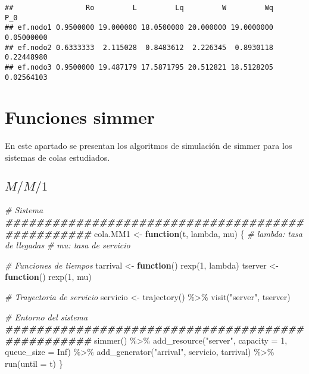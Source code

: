 \documentclass[
]{book}
\newenvironment{Shaded}{\begin{snugshade}}{\end{snugshade}}
\newcommand{\AttributeTok}[1]{\textcolor[rgb]{0.77,0.63,0.00}{#1}}
\newcommand{\CommentTok}[1]{\textcolor[rgb]{0.56,0.35,0.01}{\textit{#1}}}
\newcommand{\ConstantTok}[1]{\textcolor[rgb]{0.00,0.00,0.00}{#1}}
\newcommand{\ControlFlowTok}[1]{\textcolor[rgb]{0.13,0.29,0.53}{\textbf{#1}}}
\newcommand{\DecValTok}[1]{\textcolor[rgb]{0.00,0.00,0.81}{#1}}
\newcommand{\DocumentationTok}[1]{\textcolor[rgb]{0.56,0.35,0.01}{\textbf{\textit{#1}}}}
\newcommand{\FunctionTok}[1]{\textcolor[rgb]{0.00,0.00,0.00}{#1}}
\newcommand{\NormalTok}[1]{#1}
\newcommand{\OtherTok}[1]{\textcolor[rgb]{0.56,0.35,0.01}{#1}}
\newcommand{\SpecialCharTok}[1]{\textcolor[rgb]{0.00,0.00,0.00}{#1}}
\newcommand{\StringTok}[1]{\textcolor[rgb]{0.31,0.60,0.02}{#1}}
\theoremstyle{definition}
\theoremstyle{definition}
\theoremstyle{definition}
\theoremstyle{definition}
\theoremstyle{remark}
\begin{document}
\begin{verbatim}
##                 Ro         L         Lq         W         Wq        P_0
## ef.nodo1 0.9500000 19.000000 18.0500000 20.000000 19.0000000 0.05000000
## ef.nodo2 0.6333333  2.115028  0.8483612  2.226345  0.8930118 0.22448980
## ef.nodo3 0.9500000 19.487179 17.5871795 20.512821 18.5128205 0.02564103
\end{verbatim}

\hypertarget{COLASF}{%
\section{Funciones simmer}\label{COLASF}}

En este apartado se presentan los algoritmos de simulación de simmer para los sistemas de colas estudiados.

\hypertarget{mm1-1}{%
\subsection{\texorpdfstring{\(M/M/1\)}{M/M/1}}\label{mm1-1}}

\begin{Shaded}
\begin{Highlighting}[]
\CommentTok{\# Sistema}
\DocumentationTok{\#\#\#\#\#\#\#\#\#\#\#\#\#\#\#\#\#\#\#\#\#\#\#\#\#\#\#\#\#\#\#\#\#\#\#\#\#\#\#\#\#\#\#\#\#\#\#\#\#}
\NormalTok{cola.MM1 }\OtherTok{\textless{}{-}} \ControlFlowTok{function}\NormalTok{(t, lambda, mu)}
\NormalTok{\{}
  \CommentTok{\# lambda: tasa de llegadas}
  \CommentTok{\# mu: tasa de servicio}

  \CommentTok{\# Funciones de tiempos}
\NormalTok{  tarrival }\OtherTok{\textless{}{-}} \ControlFlowTok{function}\NormalTok{() }\FunctionTok{rexp}\NormalTok{(}\DecValTok{1}\NormalTok{, lambda)}
\NormalTok{  tserver }\OtherTok{\textless{}{-}} \ControlFlowTok{function}\NormalTok{() }\FunctionTok{rexp}\NormalTok{(}\DecValTok{1}\NormalTok{, mu)}
  
  \CommentTok{\# Trayectoria de servicio}
\NormalTok{  servicio }\OtherTok{\textless{}{-}} \FunctionTok{trajectory}\NormalTok{() }\SpecialCharTok{\%\textgreater{}\%}
    \FunctionTok{visit}\NormalTok{(}\StringTok{"server"}\NormalTok{, tserver)               }

  \CommentTok{\# Entorno del sistema }
  \DocumentationTok{\#\#\#\#\#\#\#\#\#\#\#\#\#\#\#\#\#\#\#\#\#\#\#\#\#\#\#\#\#\#\#\#\#\#\#\#\#\#\#\#\#\#\#\#\#\#\#\#\#}
  \FunctionTok{simmer}\NormalTok{() }\SpecialCharTok{\%\textgreater{}\%}
    \FunctionTok{add\_resource}\NormalTok{(}\StringTok{"server"}\NormalTok{, }\AttributeTok{capacity =} \DecValTok{1}\NormalTok{, }\AttributeTok{queue\_size =} \ConstantTok{Inf}\NormalTok{) }\SpecialCharTok{\%\textgreater{}\%}           
    \FunctionTok{add\_generator}\NormalTok{(}\StringTok{"arrival"}\NormalTok{, servicio, tarrival) }\SpecialCharTok{\%\textgreater{}\%} 
    \FunctionTok{run}\NormalTok{(}\AttributeTok{until =}\NormalTok{ t)     }
\NormalTok{\}}
\end{Highlighting}
\end{Shaded}
\end{document}
